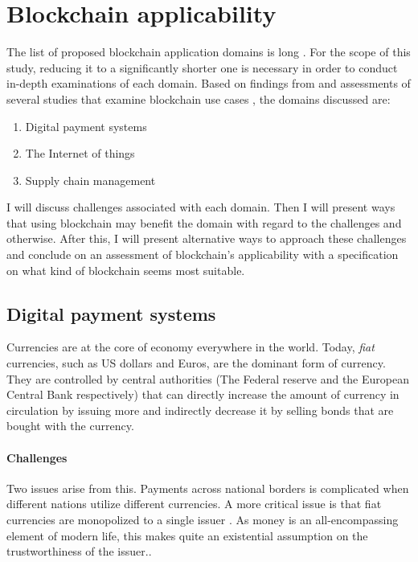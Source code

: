 \section{Blockchain applicability} \label{applications}

The list of proposed blockchain application domains is long
\cite{zileUseCases}. For the scope of this study, reducing it to a
significantly shorter one is necessary in order to conduct in-depth
examinations of each domain. Based on findings from \cite{jaoudeApplications} 
and assessments of several studies that examine blockchain use cases
\cite{sankaScalability,wustBlockchainNeed,zhengChallenges}, the
domains discussed are:

\begin{enumerate}
  \item Digital payment systems
  \item The Internet of things
  \item Supply chain management
\end{enumerate}

I will discuss challenges associated with each domain. Then I will present
ways that using blockchain may benefit the domain with regard to the
challenges and otherwise. After this, I will present alternative ways
to approach these challenges and conclude on an assessment of blockchain's
applicability with a specification on what kind of blockchain seems most
suitable.

\subsection{Digital payment systems}

Currencies are at the core of economy everywhere in the world. Today,
\textit{fiat} currencies, such as US dollars and Euros, are the
dominant form of currency. They are controlled by central authorities (The
Federal reserve and the European Central Bank respectively) that can
directly increase the amount of currency in circulation by issuing more
and indirectly decrease it by selling bonds that are bought with the
currency.

\paragraph{Challenges} Two  issues arise from this. Payments
across national borders is complicated when different nations utilize
different currencies. A more critical issue is that fiat currencies
are monopolized to a single issuer \cite{eichengreenCommodity}. As
money is an all-encompassing element of modern life, this makes quite
an existential assumption on the trustworthiness of the issuer.. 

